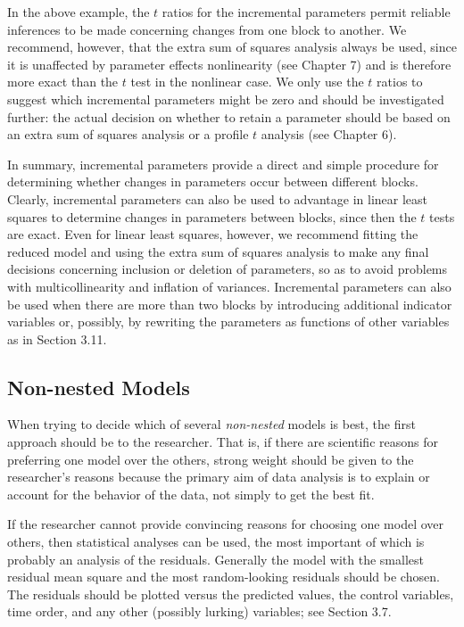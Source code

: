 In the above example, the $t$ ratios for the
incremental parameters permit reliable
inferences to be made concerning changes from one block to
another.
We recommend, however, that the extra sum of squares analysis
always be used,
since it is unaffected by parameter effects
nonlinearity (see Chapter 7) and is therefore more exact than the $t$ test
in the nonlinear case.
We only use the $t$ ratios to suggest which incremental
parameters might be zero and should be investigated
further:
the actual decision on whether to retain a parameter should be based on an
extra sum of squares analysis or a profile $t$ analysis (see Chapter 6).

In summary, incremental parameters provide a direct and simple
procedure for determining whether changes in parameters occur
between different blocks.
Clearly, incremental parameters can also be used
to advantage in linear least squares to
determine changes in parameters between blocks, since then the
$t$ tests are exact.
Even for linear least squares, however, we recommend fitting the
reduced model and using the extra sum of squares analysis to
make any final decisions concerning inclusion or deletion of
parameters, so as to avoid problems with multicollinearity and inflation
of variances.
Incremental parameters can also be used when there are more than
two blocks by introducing additional indicator variables or,
possibly, by rewriting the parameters as functions of other
variables as in Section 3.11.

\subsection{Non-nested Models}

When trying to decide which of several \emph{non-nested} models is
best, the first approach should be to the researcher.
That is, if there are scientific reasons for preferring one model
over the others, strong weight should be given to the
researcher's reasons because the primary aim of data analysis is
to explain or account for the behavior of the data, not simply to
get the best fit.

If the researcher cannot provide convincing reasons for choosing
one model over others, then statistical analyses can be used, the
most important of which is probably an analysis of the residuals.
Generally the model with the smallest residual mean square and
the most random-looking residuals should be chosen.
The residuals should be plotted versus the predicted values, the
control variables, time order, and any other (possibly lurking)
variables; see Section 3.7.

